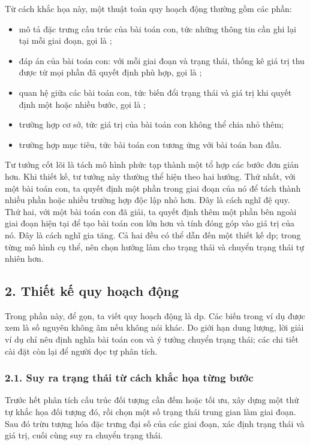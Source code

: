 \documentclass[11pt]{article}
\begin{document}
Từ cách khắc họa này, một thuật toán quy hoạch động thường gồm các phần:

\begin{itemize}
  \item mô tả đặc trưng cấu trúc của bài toán con, tức những thông tin cần ghi
  lại tại mỗi giai đoạn, gọi là ;
  \item đáp án của bài toán con: với mỗi giai đoạn và trạng thái, thống kê giá
  trị thu được từ mọi phần đã quyết định phù hợp, gọi là ;
  \item quan hệ giữa các bài toán con, tức biến đổi trạng thái và giá trị khi
  quyết định một hoặc nhiều bước, gọi là ;
  \item trường hợp cơ sở, tức giá trị của bài toán con không thể chia nhỏ thêm;
  \item trường hợp mục tiêu, tức bài toán con tương ứng với bài toán ban đầu.
\end{itemize}

Tư tưởng cốt lõi là tách mô hình phức tạp thành một tổ hợp các bước đơn giản
hơn. Khi thiết kế, tư tưởng này thường thể hiện theo hai hướng. Thứ nhất, với
một bài toán con, ta quyết định một phần trong giai đoạn của nó để tách thành
nhiều phần hoặc nhiều trường hợp độc lập nhỏ hơn. Đây là cách nghĩ đệ quy. Thứ
hai, với một bài toán con đã giải, ta quyết định thêm một phần bên ngoài giai
đoạn hiện tại để tạo bài toán con lớn hơn và tính đóng góp vào giá trị của nó.
Đây là cách nghĩ gia tăng. Cả hai đều có thể dẫn đến một thiết kế
\(\mathrm{dp}\); trong từng mô hình cụ thể, nên chọn hướng làm cho trạng thái
và chuyển trạng thái tự nhiên hơn.

\subsection*{2. Thiết kế quy hoạch động}

Trong phần này, để gọn, ta viết quy hoạch động là \(\mathrm{dp}\). Các biến
trong ví dụ được xem là số nguyên không âm nếu không nói khác. Do giới hạn dung
lượng, lời giải ví dụ chỉ nêu định nghĩa bài toán con và ý tưởng chuyển trạng
thái; các chi tiết cài đặt còn lại để người đọc tự phân tích.

\subsubsection*{2.1. Suy ra trạng thái từ cách khắc họa từng bước}

Trước hết phân tích cấu trúc đối tượng cần đếm hoặc tối ưu, xây dựng một thứ tự
khắc họa đối tượng đó, rồi chọn một số trạng thái trung gian làm giai đoạn. Sau
đó trừu tượng hóa đặc trưng đại số của các giai đoạn, xác định trạng thái và
giá trị, cuối cùng suy ra chuyển trạng thái.
\end{document}
